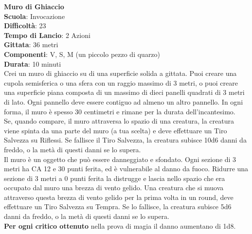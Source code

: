 \begin{multicols}{2}
\medskip\textbf{Muro di Ghiaccio}\\
\textbf{Scuola}: Invocazione\\
\textbf{Difficoltà}: 23\\
\textbf{Tempo di Lancio}: 2 Azioni\\
\textbf{Gittata}: 36 metri\\
\textbf{Componenti}: V, S, M (un piccolo pezzo di quarzo)\\
\textbf{Durata}: 10 minuti\\
Crei un muro di ghiaccio su di una superficie solida a gittata. Puoi creare una cupola semisferica o una sfera con un raggio massimo di 3 metri, o puoi creare una superficie piana composta di un massimo di dieci panelli quadrati di 3 metri di lato. Ogni pannello deve essere contiguo ad almeno un altro pannello. In ogni forma, il muro è spesso 30 centimetri e rimane per la durata dell'incantesimo. \\
Se, quando compare, il muro attraversa lo spazio di una creatura, la creatura viene spinta da una parte del muro (a tua scelta) e deve effettuare un Tiro Salvezza su Riflessi. Se fallisce il Tiro Salvezza, la creatura subisce 10d6 danni da freddo, o la metà di questi danni se lo supera.\\
Il muro è un oggetto che può essere danneggiato e sfondato. Ogni sezione di 3 metri ha CA 12 e 30 punti ferita, ed è vulnerabile al danno da fuoco. Ridurre una sezione di 3 metri a 0 punti ferita la distrugge e lascia nello spazio che era occupato dal muro una brezza di vento gelido. Una creatura che si muova attraverso questa brezza di vento gelido per la prima volta in un round, deve effettuare un Tiro Salvezza su Tempra. Se lo fallisce, la creatura subisce 5d6 danni da freddo, o la metà di questi danni se lo supera.\\
\textbf{Per ogni critico ottenuto} nella prova di magia il danno aumentano di 1d8.


\end{multicols}
